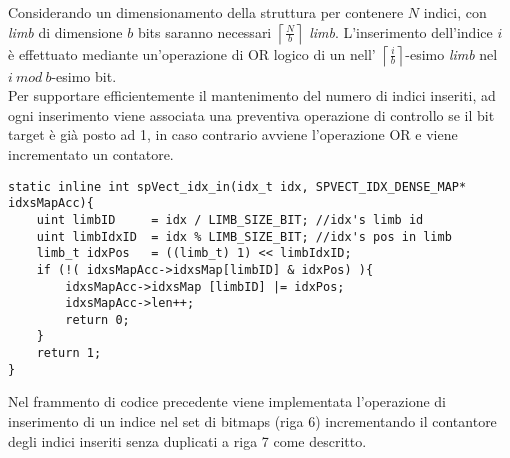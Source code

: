Considerando un dimensionamento della struttura per contenere $N$ indici, con \emph{limb} di dimensione $b$ bits
saranno necessari $\left\lceil \frac{N}{b}  \right\rceil$ \emph{limb}.
L'inserimento dell'indice $i$ è effettuato mediante un'operazione di OR logico di un  nell'
$\left\lceil \frac{i}{b}  \right\rceil$-esimo \emph{limb} nel $i ~mod~ b$-esimo bit.\\
Per supportare efficientemente il mantenimento del numero di indici inseriti, ad ogni inserimento 
viene associata una preventiva operazione di controllo se il bit target è già posto ad 1,
in caso contrario avviene l'operazione OR e viene incrementato un contatore.\\
\begin{lstlisting}
static inline int spVect_idx_in(idx_t idx, SPVECT_IDX_DENSE_MAP* idxsMapAcc){
	uint limbID 	= idx / LIMB_SIZE_BIT; //idx's limb id
	uint limbIdxID	= idx % LIMB_SIZE_BIT; //idx's pos in limb
	limb_t idxPos   = ((limb_t) 1) << limbIdxID;
	if (!( idxsMapAcc->idxsMap[limbID] & idxPos) ){
		idxsMapAcc->idxsMap [limbID] |= idxPos;
		idxsMapAcc->len++;
		return 0;
	}
	return 1;
}
\end{lstlisting}
Nel frammento di codice precedente viene implementata l'operazione di inserimento di un indice nel set di bitmaps (riga 6) 
incrementando il contantore degli indici inseriti senza duplicati a riga 7 come descritto.\\

